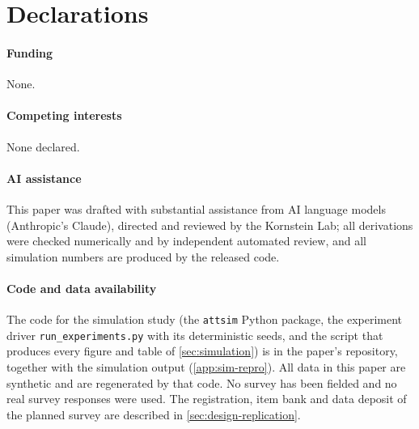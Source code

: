 \documentclass[11pt]{article}
\begin{document}

\section*{Declarations}
\paragraph{Funding} None.
\paragraph{Competing interests} None declared.
\paragraph{AI assistance} This paper was drafted with substantial assistance
from AI language models (Anthropic's Claude), directed and reviewed by the
Kornstein Lab; all derivations were checked numerically and by independent
automated review, and all simulation numbers are produced by the released
code.
\paragraph{Code and data availability} The code for the simulation study (the
\texttt{attsim} Python package, the experiment driver
\texttt{run\_experiments.py} with its deterministic seeds, and the script that
produces every figure and table of \cref{sec:simulation}) is in the paper's
repository, together with the simulation output (\cref{app:sim-repro}). All
data in this paper are synthetic and are regenerated by that code. No survey
has been fielded and no real survey responses were used. The registration,
item bank and data deposit of the planned survey are described in
\cref{sec:design-replication}.




\clearpage
\appendix
{}
\end{document}
